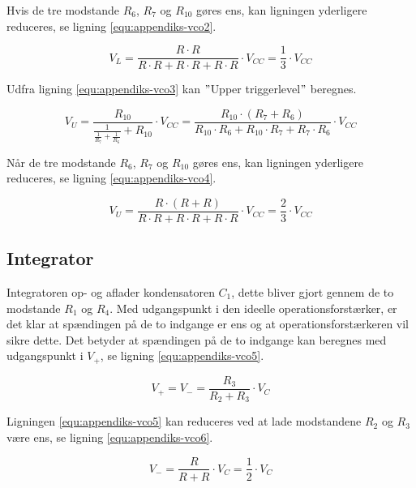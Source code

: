 Hvis de tre modstande $R_6$, $R_7$ og $R_{10}$ gøres ens, kan ligningen yderligere reduceres, se ligning \ref{equ:appendiks-vco2}.

\begin{equation}
\label{equ:appendiks-vco2}
V_L = \frac{R \cdot R}{R \cdot R + R \cdot R + R \cdot R} \cdot V_{CC} = \frac{1}{3} \cdot V_{CC}
\end{equation}

Udfra ligning \ref{equ:appendiks-vco3} kan $"$Upper triggerlevel$"$ beregnes.

\begin{equation}
\label{equ:appendiks-vco3}
V_U = \frac{R_{10}}{\frac{1}{\frac{1}{R_7} + \frac{1}{R_6}} + R_{10}} \cdot V_{CC} = \frac{R_{10} \cdot (R_7 + R_6)}{R_{10} \cdot R_6 + R_{10} \cdot R_7 + R_7 \cdot R_6} \cdot V_{CC}
\end{equation}

Når de tre modstande $R_6$, $R_7$ og $R_{10}$ gøres ens, kan ligningen yderligere reduceres, se ligning \ref{equ:appendiks-vco4}.

\begin{equation}
\label{equ:appendiks-vco4}
V_U = \frac{R \cdot (R + R)}{R \cdot R + R \cdot R + R \cdot R} \cdot V_{CC} = \frac{2}{3} \cdot V_{CC}
\end{equation}

\subsection*{Integrator}
Integratoren op- og aflader kondensatoren $C_1$, dette bliver gjort gennem de to modstande $R_1$ og $R_4$. Med udgangspunkt i den ideelle operationsforstærker, er det klar at spændingen på de to indgange er ens og at operationsforstærkeren vil sikre dette. Det betyder at spændingen på de to indgange kan beregnes med udgangspunkt i $V_+$, se ligning \ref{equ:appendiks-vco5}.

\begin{equation}
\label{equ:appendiks-vco5}
V_+ = V_- = \frac{R_3}{R_2 + R_3} \cdot V_C
\end{equation}

Ligningen \ref{equ:appendiks-vco5} kan reduceres ved at lade modstandene $R_2$ og $R_3$ være ens, se ligning \ref{equ:appendiks-vco6}.

\begin{equation}
\label{equ:appendiks-vco6}
V_- = \frac{R}{R + R} \cdot V_C = \frac{1}{2} \cdot V_C
\end{equation}

